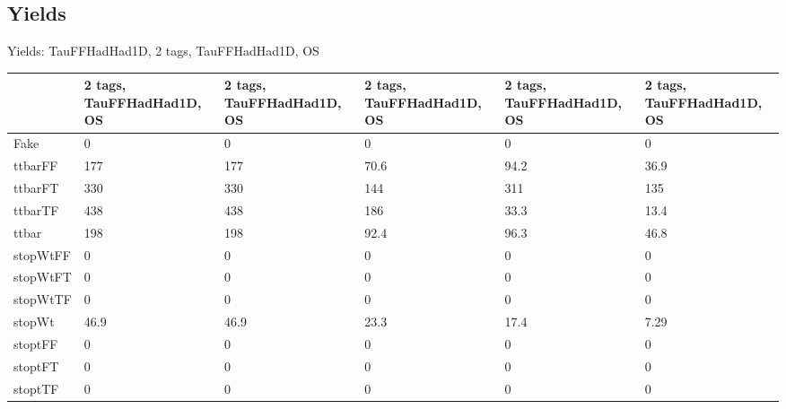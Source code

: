 
\subsection{Yields}

\begin{frame}{Yields: TauFFHadHad1D, 2 tags, TauFFHadHad1D, OS}
\begin{center}
  \begin{tabular}{l| >{\centering\let\newline\\\arraybackslash\hspace{0pt}}m{1.4cm}| >{\centering\let\newline\\\arraybackslash\hspace{0pt}}m{1.4cm}| >{\centering\let\newline\\\arraybackslash\hspace{0pt}}m{1.4cm}| >{\centering\let\newline\\\arraybackslash\hspace{0pt}}m{1.4cm}| >{\centering\let\newline\\\arraybackslash\hspace{0pt}}m{1.4cm}}
    & 2 tags, TauFFHadHad1D, OS & 2 tags, TauFFHadHad1D, OS & 2 tags, TauFFHadHad1D, OS & 2 tags, TauFFHadHad1D, OS & 2 tags, TauFFHadHad1D, OS \\
 \hline \hline
    Fake& 0 & 0 & 0 & 0 & 0 \\
 \hline
    ttbarFF& 177 & 177 & 70.6 & 94.2 & 36.9 \\
 \hline
    ttbarFT& 330 & 330 & 144 & 311 & 135 \\
 \hline
    ttbarTF& 438 & 438 & 186 & 33.3 & 13.4 \\
 \hline
    ttbar& 198 & 198 & 92.4 & 96.3 & 46.8 \\
 \hline
    stopWtFF& 0 & 0 & 0 & 0 & 0 \\
 \hline
    stopWtFT& 0 & 0 & 0 & 0 & 0 \\
 \hline
    stopWtTF& 0 & 0 & 0 & 0 & 0 \\
 \hline
    stopWt& 46.9 & 46.9 & 23.3 & 17.4 & 7.29 \\
 \hline
    stoptFF& 0 & 0 & 0 & 0 & 0 \\
 \hline
    stoptFT& 0 & 0 & 0 & 0 & 0 \\
 \hline
    stoptTF& 0 & 0 & 0 & 0 & 0 \\

\end{tabular}
\end{center}
\end{frame}
